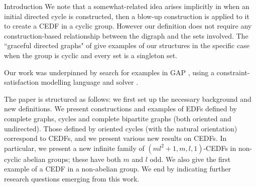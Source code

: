 \documentclass[12pt, a4paper]{article}
\theoremstyle{definition}
\begin{document}
\begin{section}{Introduction}
We note that a somewhat-related idea arises implicitly in \cite{PatSti2} when an initial directed cycle is constructed, then a blow-up construction is applied to it to create a CEDF in a cyclic group.  However our definition does not require any construction-based relationship between the digraph and the sets involved.  The ``graceful directed graphs" of \cite{BloHsu} give examples of our structures in the specific case when the group is cyclic and every set is a singleton set.

Our work was underpinned by search for examples in GAP \cite{GAP}, using a constraint-satisfaction modelling language \cite{Akg} and solver \cite{GenJefMig}.

The paper is structured as follows: we first set up the necessary background and new definitions.  We present constructions and examples of EDFs defined by complete graphs, cycles and complete bipartite graphs (both oriented and undirected). Those defined by oriented cycles (with the natural orientation) correspond to CEDFs, and we present various new results on CEDFs.  In particular, we present a new infinite family of $(ml^2+1,m,l,1)$-CEDFs in non-cyclic abelian groups; these have both $m$ and $l$ odd.  We also give the first example of a CEDF in a non-abelian group.  We end by indicating further research questions emerging from this work.
\end{section}
\end{document}
